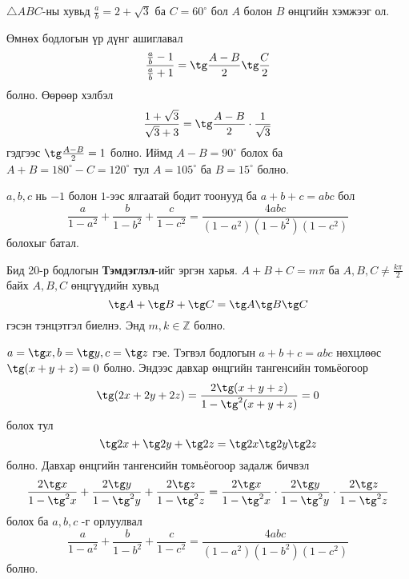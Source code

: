 \documentclass[10pt,a4paper,oneside]{book}
\begin{document}
\Problem
$\triangle ABC$-ны хувьд $\frac{a}{b} = 2+\sqrt{3}$ ба $C = 60^\circ$ бол $A$ болон $B$ өнцгийн хэмжээг ол.

\TheSolution
Өмнөх бодлогын үр дүнг ашиглавал
\begin{equation*}
\frac{\frac{a}{b} - 1}{\frac{a}{b} + 1} = \tg \frac{A-B}{2}\tg\frac{C}{2}
\end{equation*}
болно. Өөрөөр хэлбэл
\begin{equation*}
\frac{1+\sqrt{3}}{\sqrt{3}+3} = \tg\frac{A-B}{2}\cdot \frac{1}{\sqrt{3}}
\end{equation*}
гэдгээс $\tg\frac{A-B}{2} = 1$ болно. Иймд $A-B = 90^\circ$ болох ба $A+B = 180^\circ - C = 120^\circ$ тул $A=105^\circ$ ба $B=15^\circ$ болно.

\Problem
$a, b, c$ нь $-1$ болон $1$-ээс ялгаатай бодит тоонууд ба $a+b+c = abc$ бол
\begin{equation*}
\frac{a}{1-a^2} + \frac{b}{1-b^2} + \frac{c}{1-c^2} = \frac{4abc}{(1-a^2)(1-b^2)(1-c^2)}
\end{equation*}
болохыг батал.

\TheSolution
Бид 20-р бодлогын \textbf{Тэмдэглэл}-ийг эргэн харья. $A+B+C = m\pi$ ба $A, B, C \neq \frac{k\pi}{2}$ байх $A, B, C$ өнцгүүдийн хувьд
\begin{equation*}
\tg A + \tg B + \tg C  = \tg A \tg B \tg C
\end{equation*}
гэсэн тэнцэтгэл биелнэ. Энд $m, k \in \mathbb{Z}$ болно.

$a=\tg x, b = \tg y, c=\tg z$ гэе. Тэгвэл бодлогын $a+b+c = abc$ нөхцлөөс $\tg(x+y+z) = 0$ болно. Эндээс давхар өнцгийн тангенсийн томьёогоор
\begin{equation*}
\tg (2x+2y+2z) = \frac{2\tg (x+y+z)}{1-\tg^2 (x+y+z)} = 0
\end{equation*}
болох тул
\begin{equation*}
\tg 2x + \tg 2y + \tg 2z = \tg 2x\tg 2y\tg 2z
\end{equation*}
болно. Давхар өнцгийн тангенсийн томьёогоор задалж бичвэл
\begin{equation*}
\frac{2\tg x}{1-\tg^2 x} + \frac{2\tg y}{1-\tg^2 y} + \frac{2\tg z}{1-\tg^2 z} = \frac{2\tg x}{1-\tg^2 x}\cdot           \frac{2\tg y}{1-\tg^2 y}\cdot \frac{2\tg z}{1-\tg^2 z}
\end{equation*}
болох ба $a, b, c$ -г орлуулвал
\begin{equation*}
\frac{a}{1-a^2} + \frac{b}{1-b^2} + \frac{c}{1-c^2} = \frac{4abc}{(1-a^2)(1-b^2)(1-c^2)}
\end{equation*}
болно.
\end{document}
